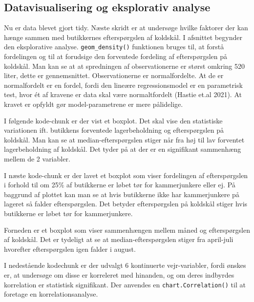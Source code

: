 \documentclass[
  12pt,
  a4paper,
  DIV=11,
  numbers=noendperiod,
  oneside,
  open=any]{scrartcl}
\begin{document}
\hypertarget{datavisualisering-og-eksplorativ-analyse}{%
\subsection{Datavisualisering og eksplorativ
analyse}\label{datavisualisering-og-eksplorativ-analyse}}

Nu er data blevet gjort tidy. Næste skridt er at undersøge hvilke
faktorer der kan hænge sammen med butikkernes efterspørgslen af
koldskål. I afsnittet begynder den eksplorative analyse.
\texttt{geom\_density()} funktionen bruges til, at forstå fordelingen og
til at forudsige den forventede fordeling af efterspørgslen på koldskål.
Man kan se at at spredningen af observationerne er størst omkring 520
liter, dette er gennemsnittet. Observationerne er normalfordelte. At de
er normalfordelt er en fordel, fordi den lineære regressionsmodel er en
parametrisk test, hvor ét af kravene er data skal være normaltfordelt
(Hastie et.al 2021). At kravet er opfyldt gør model-parametrene er mere
pålidelige.

I følgende kode-chunk er der vist et boxplot. Det skal vise den
statistiske variationen ift. butikkens forventede lagerbeholdning og
efterspørgslen på koldskål. Man kan se at median-efterspørgslen stiger
når fra høj til lav forventet lagerbeholdning af koldskål. Det tyder på
at der er en signifikant sammenhæng mellem de 2 variabler.

I næste kode-chunk er der lavet et boxplot som viser fordelingen af
efterspørgslen i forhold til om 25\% af butikkerne er løbet tør for
kammerjunkere eller ej. På baggrund af plottet kan man se at hvis
butikkerne ikke har kammerjunkere på lageret så falder efterspørgslen.
Det betyder efterspørgslen på koldskål stiger hvis butikkerne er løbet
tør for kammerjunkere.

Forneden er et boxplot som viser sammenhængen mellem måned og
efterspørgslen af koldskål. Det er tydeligt at se at
median-efterspørgslen stiger fra april-juli hvorefter efterspørgslen
igen falder i august.

I nedestående kodechunk er der udvalgt 6 kontinuerte vejr-variabler,
fordi ønskes er, at undersøge om disse er korreleret med hinanden, og om
deres indbyrdes korrelation er statistisk signifikant. Der anvendes en
\texttt{chart.Correlation()} til at foretage en korrelationsanalyse.
\end{document}
